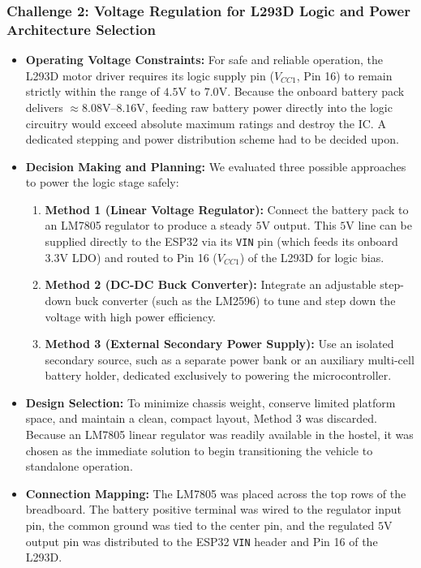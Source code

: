 \documentclass[journal,12pt,onecolumn]{IEEEtran}
\begin{document}
\subsubsection*{Challenge 2: Voltage Regulation for L293D Logic and Power Architecture Selection}
\begin{itemize}
	\item \textbf{Operating Voltage Constraints:} For safe and reliable operation, the L293D motor driver requires its logic supply pin ($V_{CC1}$, Pin 16) to remain strictly within the range of $4.5\text{V}$ to $7.0\text{V}$. Because the onboard battery pack delivers $\approx 8.08\text{V--}8.16\text{V}$, feeding raw battery power directly into the logic circuitry would exceed absolute maximum ratings and destroy the IC. A dedicated stepping and power distribution scheme had to be decided upon.
	
	\item \textbf{Decision Making and Planning:} We evaluated three possible approaches to power the logic stage safely:
	\begin{enumerate}
		\item \textbf{Method 1 (Linear Voltage Regulator):} Connect the battery pack to an LM7805 regulator to produce a steady $5\text{V}$ output. This $5\text{V}$ line can be supplied directly to the ESP32 via its \texttt{VIN} pin (which feeds its onboard $3.3\text{V}$ LDO) and routed to Pin 16 ($V_{CC1}$) of the L293D for logic bias.
		\item \textbf{Method 2 (DC-DC Buck Converter):} Integrate an adjustable step-down buck converter (such as the LM2596) to tune and step down the voltage with high power efficiency.
		\item \textbf{Method 3 (External Secondary Power Supply):} Use an isolated secondary source, such as a separate power bank or an auxiliary multi-cell battery holder, dedicated exclusively to powering the microcontroller.
	\end{enumerate}
	
	\item \textbf{Design Selection:} To minimize chassis weight, conserve limited platform space, and maintain a clean, compact layout, Method 3 was discarded. Because an LM7805 linear regulator was readily available in the hostel, it was chosen as the immediate solution to begin transitioning the vehicle to standalone operation.
	
	\item \textbf{Connection Mapping:} The LM7805 was placed across the top rows of the breadboard. The battery positive terminal was wired to the regulator input pin, the common ground was tied to the center pin, and the regulated $5\text{V}$ output pin was distributed to the ESP32 \texttt{VIN} header and Pin 16 of the L293D.
	

\end{itemize}
\end{document}
